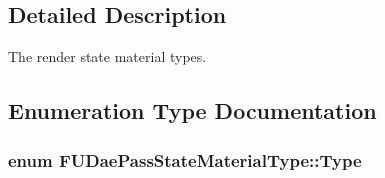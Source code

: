 \subsection{Detailed Description}
The render state material types. 

\subsection{Enumeration Type Documentation}
\hypertarget{namespaceFUDaePassStateMaterialType_a2fa49d07f22c50ef1605547df2ffd1b6}{
\subsubsection[{Type}]{\setlength{\rightskip}{0pt plus 5cm}enum {\bf FUDaePassStateMaterialType::Type}}}
\label{namespaceFUDaePassStateMaterialType_a2fa49d07f22c50ef1605547df2ffd1b6}
